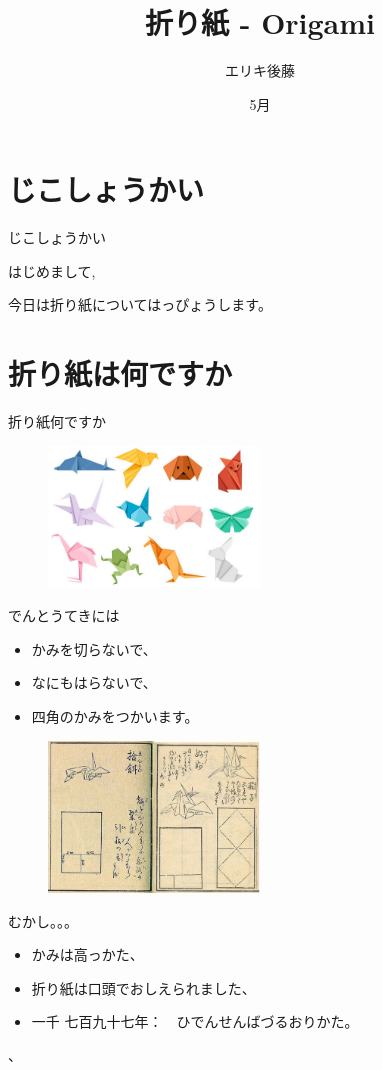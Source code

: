 \documentclass{beamer}
\author{エリキ後藤}
\title{折り紙 - Origami}
\subtitle{}
\institute{UNICAMP}
\date{5月}
\begin{document}
\kaishu
\begin{frame}
    \titlepage
\end{frame}

\section{じこしょうかい}
\begin{frame}{じこしょうかい}
    \begin{flushleft}
    \Huge
        はじめまして,
    \end{flushleft}
    \Large
    \begin{flushright}
        今日は折り紙についてはっぴょうします。
    \end{flushright}
\end{frame}

\section{折り紙は何ですか}
\begin{frame}{折り紙何ですか}

	\begin{figure}
			\includegraphics[width=0.5\textwidth]{a.png}
	\end{figure}
	でんとうてきには
	\begin{itemize}
		\item かみを切らないで、
		\item なにもはらないで、
		\item 四角のかみをつかいます。
	\end{itemize}
\end{frame}
\begin{frame}
	\begin{figure}
			\includegraphics[width=0.5\textwidth]{aa.png}
	\end{figure}
	むかし。。。
	\begin{itemize}
		\item かみは高っかた、
		\item 折り紙は口頭でおしえられました、
		\item 一千 七百九十七年：　ひでんせんばづるおりかた。
	\end{itemize}、
\end{frame}
\end{document}
